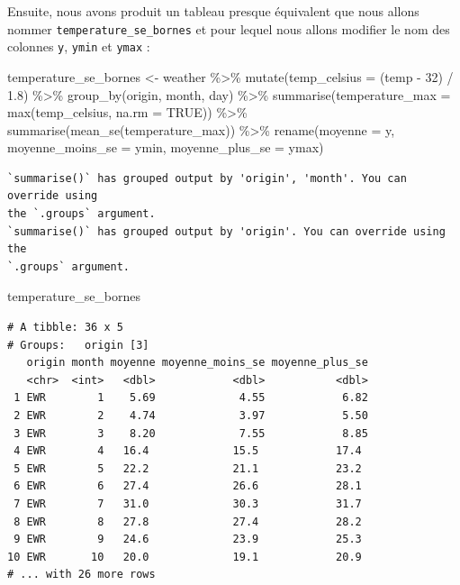 \documentclass[
  a4paper,
  DIV=11,
  numbers=noendperiod,
  oneside]{scrreprt}
\newenvironment{Shaded}{}{}
\newcommand{\AttributeTok}[1]{\textcolor[rgb]{0.84,0.23,0.29}{#1}}
\newcommand{\ConstantTok}[1]{\textcolor[rgb]{0.00,0.36,0.77}{#1}}
\newcommand{\DecValTok}[1]{\textcolor[rgb]{0.00,0.36,0.77}{#1}}
\newcommand{\FloatTok}[1]{\textcolor[rgb]{0.00,0.36,0.77}{#1}}
\newcommand{\FunctionTok}[1]{\textcolor[rgb]{0.44,0.26,0.76}{#1}}
\newcommand{\NormalTok}[1]{\textcolor[rgb]{0.14,0.16,0.18}{#1}}
\newcommand{\OtherTok}[1]{\textcolor[rgb]{0.44,0.26,0.76}{#1}}
\newcommand{\SpecialCharTok}[1]{\textcolor[rgb]{0.00,0.36,0.77}{#1}}
\begin{document}
Ensuite, nous avons produit un tableau presque équivalent que nous
allons nommer \texttt{temperature\_se\_bornes} et pour lequel nous
allons modifier le nom des colonnes \texttt{y}, \texttt{ymin} et
\texttt{ymax} :

\begin{Shaded}
\begin{Highlighting}[]
\NormalTok{temperature\_se\_bornes }\OtherTok{\textless{}{-}}\NormalTok{ weather }\SpecialCharTok{\%\textgreater{}\%} 
  \FunctionTok{mutate}\NormalTok{(}\AttributeTok{temp\_celsius =}\NormalTok{ (temp }\SpecialCharTok{{-}} \DecValTok{32}\NormalTok{) }\SpecialCharTok{/} \FloatTok{1.8}\NormalTok{) }\SpecialCharTok{\%\textgreater{}\%} 
  \FunctionTok{group\_by}\NormalTok{(origin, month, day) }\SpecialCharTok{\%\textgreater{}\%} 
  \FunctionTok{summarise}\NormalTok{(}\AttributeTok{temperature\_max =} \FunctionTok{max}\NormalTok{(temp\_celsius, }\AttributeTok{na.rm =} \ConstantTok{TRUE}\NormalTok{)) }\SpecialCharTok{\%\textgreater{}\%} 
  \FunctionTok{summarise}\NormalTok{(}\FunctionTok{mean\_se}\NormalTok{(temperature\_max)) }\SpecialCharTok{\%\textgreater{}\%} 
  \FunctionTok{rename}\NormalTok{(}\AttributeTok{moyenne =}\NormalTok{ y,}
         \AttributeTok{moyenne\_moins\_se =}\NormalTok{ ymin,}
         \AttributeTok{moyenne\_plus\_se =}\NormalTok{ ymax)}
\end{Highlighting}
\end{Shaded}

\begin{verbatim}
`summarise()` has grouped output by 'origin', 'month'. You can override using
the `.groups` argument.
`summarise()` has grouped output by 'origin'. You can override using the
`.groups` argument.
\end{verbatim}

\begin{Shaded}
\begin{Highlighting}[]
\NormalTok{temperature\_se\_bornes}
\end{Highlighting}
\end{Shaded}

\begin{verbatim}
# A tibble: 36 x 5
# Groups:   origin [3]
   origin month moyenne moyenne_moins_se moyenne_plus_se
   <chr>  <int>   <dbl>            <dbl>           <dbl>
 1 EWR        1    5.69             4.55            6.82
 2 EWR        2    4.74             3.97            5.50
 3 EWR        3    8.20             7.55            8.85
 4 EWR        4   16.4             15.5            17.4 
 5 EWR        5   22.2             21.1            23.2 
 6 EWR        6   27.4             26.6            28.1 
 7 EWR        7   31.0             30.3            31.7 
 8 EWR        8   27.8             27.4            28.2 
 9 EWR        9   24.6             23.9            25.3 
10 EWR       10   20.0             19.1            20.9 
# ... with 26 more rows
\end{verbatim}
\end{document}

